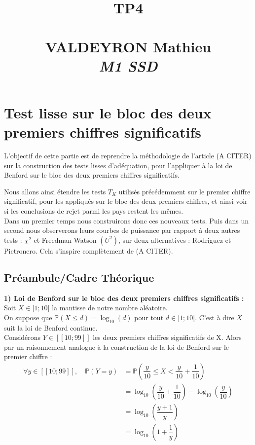 \documentclass[12pt,a4paper]{article}
\title{{\Huge \textbf{TP4}} \\ \bigskip {\Huge \textbf{ADM}} \\ \bigskip \bigskip \bigskip VALDEYRON Mathieu \\ \bigskip \bigskip \emph{M1 SSD}}
\begin{document}
\section{Test lisse sur le bloc des deux premiers chiffres significatifs}


L'objectif de cette partie est de reprendre la méthodologie de l'article (A CITER) sur la construction des tests lisses d'adéquation, pour l'appliquer à la loi de Benford sur le bloc des deux premiers chiffres significatifs.

Nous allons ainsi étendre les tests $T_{K}$ utilisés précédemment sur le premier chiffre significatif, pour les appliqués sur le bloc des deux premiers chiffres, et ainsi voir si les conclusions de rejet parmi les pays restent les mêmes.
\\

Dans un premier temps nous construirons donc ces nouveaux tests. Puis dans un second nous observerons leurs courbes de puissance par rapport à deux autres tests : $\chi^{2}$ et Freedman-Watson $(U^{2})$, sur deux alternatives : Rodriguez et Pietronero. Cela s'inspire complètement de (A CITER).


\subsection{Préambule/Cadre Théorique \\}


\textbf{1) Loi de Benford sur le bloc des deux premiers chiffres significatifs :}
\\

Soit $X \in [1;10[$ la mantisse de notre nombre aléatoire. \\
On suppose que $\mathbb{P}(X \leq d) = \log_{10}(d)$ pour tout $d \in [1;10[$. C'est à dire $X$ suit la loi de Benford continue.
\\

Considérons $Y \in [\![ 10; 99 ]\!]$ les deux premiers chiffres significatifs de X. Alors par un raisonnement analogue à la construction de la loi de Benford sur le premier chiffre :
\begin{align*}
\forall y \in [\![ 10; 99 ]\!], \quad \mathbb{P}(Y=y) & = \mathbb{P} \left( \dfrac{y}{10} \leq X < \dfrac{y}{10} + \dfrac{1}{10}\right) \\
& = \log_{10}\left( \dfrac{y}{10} + \dfrac{1}{10} \right) - \log_{10}\left( \dfrac{y}{10} \right) \\
& = \log_{10} \left( \dfrac{y+1}{y} \right) \\
& = \log_{10} \left( 1 + \dfrac{1}{y} \right)
\end{align*}
\end{document}
